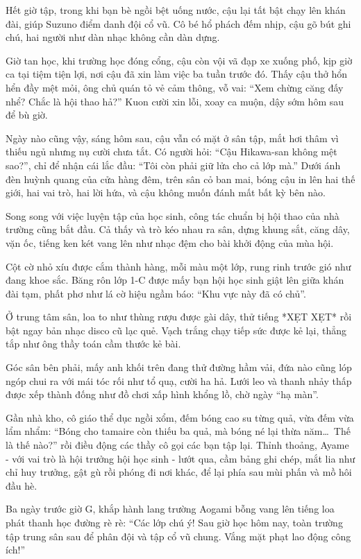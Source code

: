 \documentclass[../main.tex]{subfiles}
\begin{document}
Hết giờ tập, trong khi bạn bè ngồi bệt uống nước, cậu lại tất bật chạy lên khán đài, giúp Suzuno điểm danh đội cổ vũ. Cô bé hổ phách đếm nhịp, cậu gõ bút ghi chú, hai người như dàn nhạc không cần dàn dựng.

Giờ tan học, khi trường học đóng cổng, cậu còn vội vã đạp xe xuống phố, kịp giờ ca tại tiệm tiện lợi, nơi cậu đã xin làm việc ba tuần trước đó. Thấy cậu thở hổn hển đầy mệt mỏi, ông chủ quán tỏ vẻ cảm thông, vỗ vai: ``Xem chừng căng đấy nhể? Chắc là hội thao hả?'' Kuon cười xin lỗi, xoay ca muộn, dậy sớm hôm sau để bù giờ.

Ngày nào cũng vậy, sáng hôm sau, cậu vẫn có mặt ở sân tập, mắt hơi thâm vì thiếu ngủ nhưng nụ cười chưa tắt. Có người hỏi: ``Cậu Hikawa-san không mệt sao?'', chỉ để nhận cái lắc đầu: ``Tôi còn phải giữ lửa cho cả lớp mà.'' Dưới ánh đèn huỳnh quang của cửa hàng đêm, trên sân cỏ ban mai, bóng cậu in lên hai thế giới, hai vai trò, hai lời hứa, và cậu không muốn đánh mất bất kỳ bên nào.

Song song với việc luyện tập của học sinh, công tác chuẩn bị hội thao của nhà trường cũng bắt đầu. Cả thấy và trò kéo nhau ra sân, dựng khung sắt, căng dây, vặn ốc, tiếng ken két vang lên như nhạc đệm cho bài khởi động của mùa hội.

Cột cờ nhỏ xíu được cắm thành hàng, mỗi màu một lớp, rung rinh trước gió như đang khoe sắc. Băng rôn lớp 1-C được mấy bạn hội học sinh giật lên giữa khán đài tạm, phất phơ như lá cờ hiệu ngầm báo: ``Khu vực này đã có chủ''.

Ở trung tâm sân, loa to như thùng rượu được gài dây, thử tiếng *XẸT XẸT* rồi bật ngay bản nhạc disco cũ lạc quẻ. Vạch trắng chạy tiếp sức được kẻ lại, thẳng tắp như ông thầy toán cầm thước kẻ bài.

Góc sân bên phải, mấy anh khối trên đang thử đường hầm vải, đứa nào cũng lóp ngóp chui ra với mái tóc rối như tổ quạ, cười ha hả. Lưới leo và thanh nhảy thấp được xếp thành đống như đồ chơi xấp hình khổng lồ, chờ ngày ``hạ màn''.

Gần nhà kho, cô giáo thể dục ngồi xổm, đếm bóng cao su từng quả, vừa đếm vừa lẩm nhẩm: ``Bóng cho tamaire còn thiếu ba quả, mà bóng né lại thừa năm\dots\ Thế là thế nào?'' rồi điều động các thầy cô gọi các bạn tập lại. Thỉnh thoảng, Ayame - với vai trò là hội trưởng hội học sinh -  lướt qua, cầm bảng ghi chép, mắt lia như chỉ huy trưởng, gật gù rồi phóng đi nơi khác, để lại phía sau mùi phấn và mồ hôi đầu hè.

\ct

Ba ngày trước giờ G, khắp hành lang trường Aogami bỗng vang lên tiếng loa phát thanh học đường rè rè: ``Các lớp chú ý! Sau giờ học hôm nay, toàn trường tập trung sân sau để phân đội và tập cổ vũ chung. Vắng mặt phạt lao động công ích!''
\end{document}
